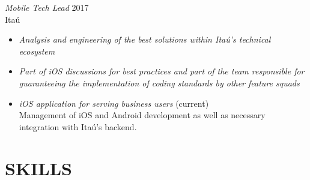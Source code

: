 \documentclass[]{res} %
\newcommand{\sbt}{\,\begin{picture}(-1,1)(-2,-3)\circle*{2}\end{picture}\ }
\def \divspace{6pt}
\def \myitemback{0.55cm}
\def \myitemsep{0pt}
\def \mypositionface{\sl}
\def \myorgface{\sc}
\newif\ifgames
\begin{document}
\begin{resume}
\begin{itemize}[itemsep=\myitemsep,leftmargin=\myitemback]
\ifgames
\else
\fi
\end{itemize}

{\mypositionface Mobile Tech Lead} \hfill 2017\\
{\myorgface Itaú}

\begin{itemize}[itemsep=\myitemsep,leftmargin=\myitemback]
\item[\sbt] {\it Analysis and engineering of the best solutions within Itaú's technical ecosystem}
\item[\sbt] {\it Part of iOS discussions for best practices and part of the team responsible for guaranteeing the implementation of coding standards by other feature squads}
\item[\sbt] {\it iOS application for serving business users} \hfill (current)\\
Management of iOS and Android development as well as necessary integration with Itaú's backend.

\ifgames
\else
\fi
\end{itemize}


\section{SKILLS \hspace{\divspace} }


\end{resume}
\end{document}

